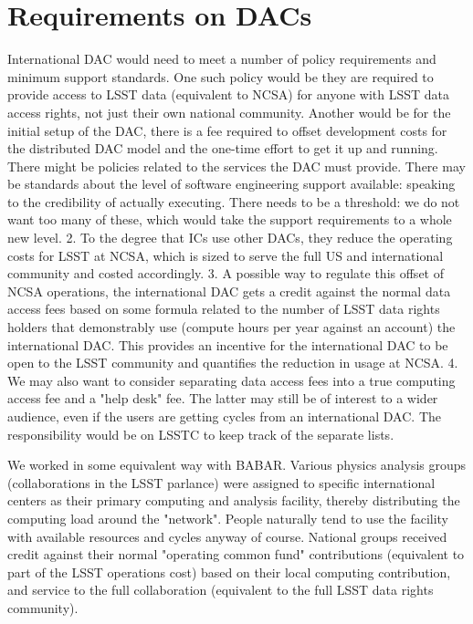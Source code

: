 \section{Requirements on DACs}
International DAC would need to meet a number of policy requirements and minimum support standards. One such policy would be they are required to provide access to LSST data (equivalent to NCSA) for anyone with LSST data access rights, not just their own national community. Another would be for the initial setup of the DAC, there is a fee required to offset development costs for the distributed DAC model and the one-time effort to get it up and running. There might be policies related to the services the DAC must provide. There may be standards about the level of software engineering support available: speaking to the credibility of actually executing. There needs to be a threshold: we do not want too many of these, which would take the support requirements to a whole new level.
2. To the degree that ICs use other DACs, they reduce the operating costs for LSST at NCSA, which is sized to serve the full US and international community and costed accordingly.
3. A possible way to regulate this offset of NCSA operations, the international DAC gets a credit against the normal data access fees based on some formula related to the number of LSST data rights holders that demonstrably use (compute hours per year against an account) the international DAC. This provides an incentive for the international DAC to be open to the LSST community and quantifies the reduction in usage at NCSA.
4. We may also want to consider separating data access fees into a true computing access fee and a "help desk" fee. The latter may still be of interest to a wider audience, even if the users are getting cycles from an international DAC. The responsibility would be on LSSTC to keep track of the separate lists.

We worked in some equivalent way with BABAR. Various physics analysis groups (collaborations in the LSST parlance) were assigned to specific international centers as their primary computing and analysis facility, thereby distributing the computing load around the "network". People naturally tend to use the facility with available resources and cycles anyway of course. National groups received credit against their normal "operating common fund" contributions (equivalent to part of the LSST operations cost) based on their local computing contribution, and service to the full collaboration (equivalent to the full LSST data rights community).
